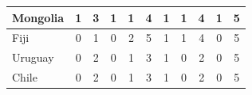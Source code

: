 \documentclass[12pt]{article}  %
\begin{document}
\begin{subappendices}
\begin{longtable}{|l|c|c|c|c|c|c|c|c|c|c|}
	\hline
	Mongolia                                                       & 1                                                                      & 3                                                                      & 1                                                                      & 1                                                                      & 4                                                                      & 1                                                                      & 1                         & 4                           & 1                           & 5                           \\ 
	\hline
	Fiji                                                           & 0                                                                      & 1                                                                      & 0                                                                      & 2                                                                      & 5                                                                      & 1                                                                      & 1                         & 4                           & 0                           & 5                           \\ 
	\hline
	Uruguay                                                        & 0                                                                      & 2                                                                      & 0                                                                      & 1                                                                      & 3                                                                      & 1                                                                      & 0                         & 2                           & 0                           & 5                           \\ 
	\hline
	Chile                                                          & 0                                                                      & 2                                                                      & 0                                                                      & 1                                                                      & 3                                                                      & 1                                                                      & 0                         & 2                           & 0                           & 5                           \\ 

\end{longtable}
\end{subappendices}
\end{document}
